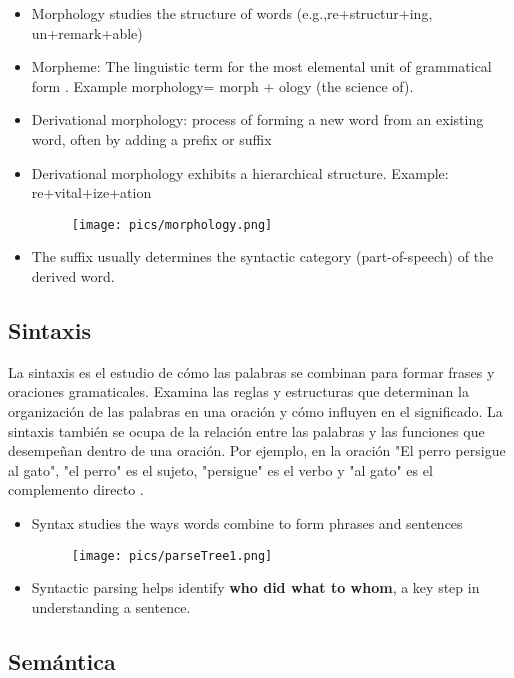 \documentclass{book}
\begin{document}
\begin{itemize}
\item Morphology studies the structure of words (e.g.,re+structur+ing, un+remark+able) \cite{JohnsonMLSS}
\item Morpheme: The linguistic term for the most elemental unit of grammatical form \cite{fromkin2018introduction}. Example morphology= morph + ology (the science of).
\item Derivational morphology: process of forming a new word from an existing word, often by adding a prefix or suffix
\item Derivational morphology exhibits a hierarchical structure. Example: re+vital+ize+ation
     \begin{figure}[h]
        	\texttt{[image: pics/morphology.png]}
        \end{figure}
\item The suffix usually determines the syntactic category (part-of-speech) of the derived word.
\end{itemize}

\subsection{Sintaxis}

La sintaxis es el estudio de cómo las palabras se combinan para formar frases y oraciones gramaticales. Examina las reglas y estructuras que determinan la organización de las palabras en una oración y cómo influyen en el significado. La sintaxis también se ocupa de la relación entre las palabras y las funciones que desempeñan dentro de una oración. Por ejemplo, en la oración "El perro persigue al gato", "el perro" es el sujeto, "persigue" es el verbo y "al gato" es el complemento directo \cite{JohnsonMLSS}.

\begin{itemize}
\item Syntax studies the ways words combine to form phrases and sentences \cite{JohnsonMLSS}
     \begin{figure}[h]
        	\texttt{[image: pics/parseTree1.png]}
        \end{figure}
\item Syntactic parsing helps identify \textbf{who did what to whom}, a key step in
understanding a sentence.
\end{itemize}


\subsection{Semántica}
\end{document}
